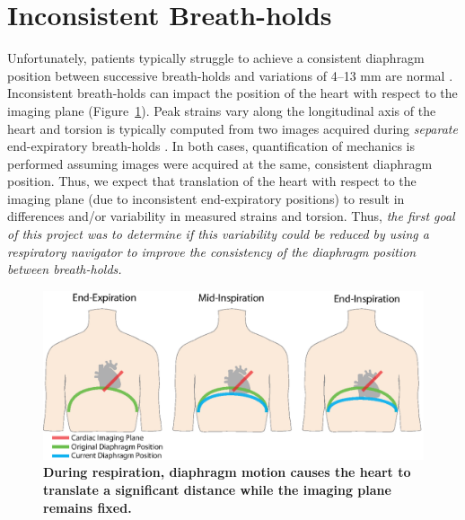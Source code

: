 \section{Inconsistent Breath-holds}
	Unfortunately, patients typically struggle to achieve a consistent diaphragm position between successive breath-holds and variations of 4--13 mm are normal \cite{Liu1993,Wang1995a,Taylor1997a,Holland1998c,Fischer2006a}. Inconsistent breath-holds can impact the position of the heart with respect to the imaging plane (Figure~\ref{fig:range_of_diaphragm_position_breathing}). Peak strains vary along the longitudinal axis of the heart \cite{Kuijer2002,Moore2000,Young1994a,Feng2009,NasiraeiMoghaddam2010,Donekal2013a,Suever2017} and torsion is typically computed from two images acquired during \textit{separate} end-expiratory breath-holds \cite{Donekal2013a}. In both cases, quantification of mechanics is performed assuming images were acquired at the same, consistent diaphragm position. Thus, we expect that translation of the heart with respect to the imaging plane (due to inconsistent end-expiratory positions) to result in differences and/or variability in measured strains and torsion. Thus, \textit{the first goal of this project was to determine if this variability could be reduced by using a respiratory navigator to improve the consistency of the diaphragm position between breath-holds.}
	
	\begin{figure}
		\centering
		\includegraphics{figures/intro/range_of_diaphragm_position_breathing}
		\caption[During respiration, diaphragm motion causes the heart to translate a significant distance while the imaging plane remains fixed]{\textbf{During respiration, diaphragm motion causes the heart to translate a significant distance while the imaging plane remains fixed.}}
		\label{fig:range_of_diaphragm_position_breathing}
	\end{figure}
	
